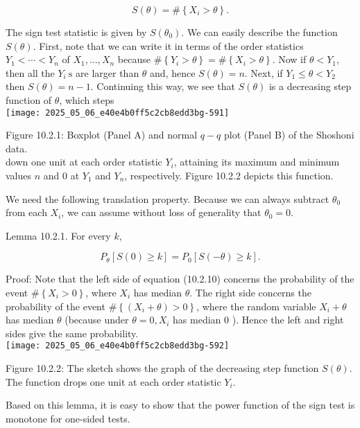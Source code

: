 \begin{equation*}
S(\theta)=\#\left\{X_{i}>\theta\right\} . \tag{10.2.9}
\end{equation*}


The sign test statistic is given by $S\left(\theta_{0}\right)$. We can easily describe the function $S(\theta)$. First, note that we can write it in terms of the order statistics $Y_{1}<\cdots<Y_{n}$ of $X_{1}, \ldots, X_{n}$ because $\#\left\{Y_{i}>\theta\right\}=\#\left\{X_{i}>\theta\right\}$. Now if $\theta<Y_{1}$, then all the $Y_{i} \mathrm{~s}$ are larger than $\theta$ and, hence $S(\theta)=n$. Next, if $Y_{1} \leq \theta<Y_{2}$ then $S(\theta)=n-1$. Continuing this way, we see that $S(\theta)$ is a decreasing step function of $\theta$, which steps\\
\texttt{[image: 2025\_05\_06\_e40e4b0ff5c2cb8edd3bg-591]}

Figure 10.2.1: Boxplot (Panel A) and normal $q-q$ plot (Panel B) of the Shoshoni data.\\
down one unit at each order statistic $Y_{i}$, attaining its maximum and minimum values $n$ and 0 at $Y_{1}$ and $Y_{n}$, respectively. Figure 10.2.2 depicts this function.

We need the following translation property. Because we can always subtract $\theta_{0}$ from each $X_{i}$, we can assume without loss of generality that $\theta_{0}=0$.

Lemma 10.2.1. For every $k$,


\begin{equation*}
P_{\theta}[S(0) \geq k]=P_{0}[S(-\theta) \geq k] . \tag{10.2.10}
\end{equation*}


Proof: Note that the left side of equation (10.2.10) concerns the probability of the event $\#\left\{X_{i}>0\right\}$, where $X_{i}$ has median $\theta$. The right side concerns the probability of the event $\#\left\{\left(X_{i}+\theta\right)>0\right\}$, where the random variable $X_{i}+\theta$ has median $\theta$ (because under $\theta=0, X_{i}$ has median 0 ). Hence the left and right sides give the same probability.\\
\texttt{[image: 2025\_05\_06\_e40e4b0ff5c2cb8edd3bg-592]}

Figure 10.2.2: The sketch shows the graph of the decreasing step function $S(\theta)$. The function drops one unit at each order statistic $Y_{i}$.

Based on this lemma, it is easy to show that the power function of the sign test is monotone for one-sided tests.

